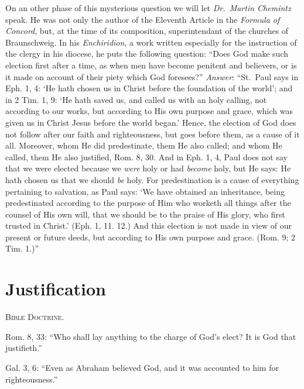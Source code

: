 \documentclass[
]{book}
\begin{document}
On an other phase of this mysterious question we will let \emph{Dr.~Martin Chemintz} speak. He was not only the author of the Eleventh Article in the \emph{Formula of Concord}, but, at the time of its composition, superintendant of the churches of Braunschweig. In his \emph{Enchiridion}, a work written especially for the instruction of the clergy in his diocese, he puts the following question: ``Does God make such election first after a time, as when men have become penitent and believers, or is it made on account of their piety which God foresees?'' \emph{Answer}: ``St.~Paul says in Eph. 1, 4: `He hath chosen us in Christ before the foundation of the world'; and in 2 Tim. 1, 9: `He hath saved us, and called us with an holy calling, not according to our works, but according to His own purpose and grace, which was given us in Christ Jesus before the world began.' Hence, the election of God does not follow after our faith and righteousness, but goes before them, as a cause of it all. Moreover, whom He did predestinate, them He also called; and whom He called, them He also justified, Rom. 8, 30. And in Eph. 1, 4, Paul does not say that we were elected because we \emph{were} holy or had \emph{become} holy, but He says: He hath chosen us that we should \emph{be} holy. For predestination is a cause of everything pertaining to salvation, as Paul says: `We have obtained an inheritance, being predestinated according to the purpose of Him who worketh all things after the counsel of His own will, that we should be to the praise of His glory, who first trusted in Christ.' (Eph. 1, 11. 12.) And this election is not made in view of our present or future deeds, but according to His own purpose and grace. (Rom. 9; 2 Tim. 1.)''

\hypertarget{justification}{%
\section*{\texorpdfstring{Justification}{Justification}}\label{justification}}

\begin{center}
\textsc{Bible Doctrine.}
\end{center}

Rom. 8, 33: ``Who shall lay anything to the charge of God's elect? It is God that justifieth.''

Gal. 3, 6: ``Even as Abraham believed God, and it was accounted to him for righteousness.''
\end{document}
